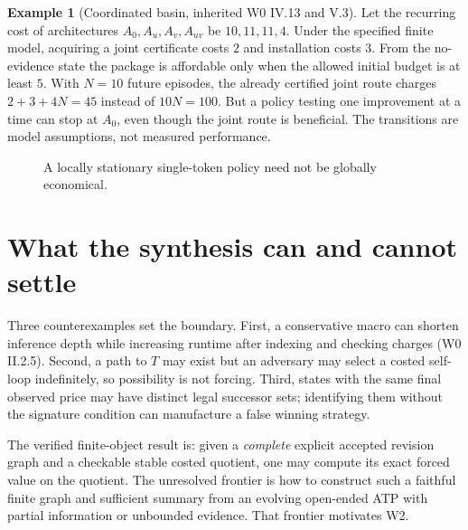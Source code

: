 \documentclass[11pt,letterpaper]{article}
\theoremstyle{definition}
\newtheorem{example}[theorem]{Example}
\theoremstyle{remark}
\begin{document}
\begin{example}[Coordinated basin, inherited W0 IV.13 and V.3]
Let the recurring cost of architectures $A_0,A_u,A_v,A_{uv}$ be $10,11,11,4$. Under the specified finite model, acquiring a joint certificate costs $2$ and installation costs $3$. From the no-evidence state the package is affordable only when the allowed initial budget is at least $5$. With $N=10$ future episodes, the already certified joint route charges $2+3+4N=45$ instead of $10N=100$. But a policy testing one improvement at a time can stop at $A_0$, even though the joint route is beneficial. The transitions are model assumptions, not measured performance.
\end{example}

\begin{figure}[ht]
\centering{}
\caption{A locally stationary single-token policy need not be globally economical.}
\end{figure}

\section{What the synthesis can and cannot settle}
Three counterexamples set the boundary. First, a conservative macro can shorten inference depth while increasing runtime after indexing and checking charges (W0 II.2.5). Second, a path to $T$ may exist but an adversary may select a costed self-loop indefinitely, so possibility is not forcing. Third, states with the same final observed price may have distinct legal successor sets; identifying them without the signature condition can manufacture a false winning strategy.

The verified finite-object result is: given a \emph{complete} explicit accepted revision graph and a checkable stable costed quotient, one may compute its exact forced value on the quotient. The unresolved frontier is how to construct such a faithful finite graph and sufficient summary from an evolving open-ended ATP with partial information or unbounded evidence. That frontier motivates W2.
\end{document}
